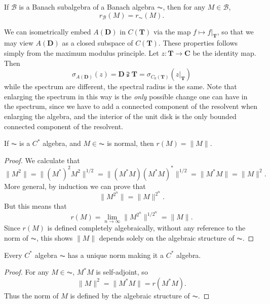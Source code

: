 \begin{corollary}
    If $\mathcal{B}$ is a Banach subalgebra of a Banach algebra $\AC$, then for any $M \in \mathcal{B}$,
    \[ r_{\mathcal{B}}(M) = r_{\AC}(M). \]
\end{corollary}

\begin{example}
    We can isometrically embed $A(\mathbf{D})$ in $C(\mathbf{T})$ via the map $f \mapsto f|_\mathbf{T}$, so that we may view $A(\mathbf{D})$ as a closed subspace of $C(\mathbf{T})$. These properties follows simply from the maximum modulus principle. Let $z: \mathbf{T} \to \mathbf{C}$ be the identity map. Then
    \[ \sigma_{A(\mathbf{D})}(z) = \mathbf{D} \supsetneqq \mathbf{T} = \sigma_{C_0(\mathbf{T})}(z|_\mathbf{T}) \]
    while the spectrum are different, the spectral radius is the same. Note that enlarging the spectrum in this way is the \emph{only} possible change one can have in the spectrum, since we have to add a connected component of the resolvent when enlarging the algebra, and the interior of the unit disk is the only bounded connected component of the resolvent.
\end{example}

\begin{corollary}
    If $\AC$ is a $C^*$ algebra, and $M \in \AC$ is normal, then $r(M) = \| M \|$.
\end{corollary}
\begin{proof}
    We calculate that
    \[ \| M^2 \| = \| (M^*)^2 M^2 \|^{1/2} = \| (M^* M) (M^* M)^* \|^{1/2} = \| M^* M \| = \| M \|^2. \]
    More general, by induction we can prove that
    \[ \| M^{2^n} \| = \| M \|^{2^n}. \]
    But this means that
    \[ r(M) = \lim_{n \to \infty} \| M^{2^n} \|^{1/2^n} = \| M \|. \]
    Since $r(M)$ is defined completely algebraically, without any reference to the norm of $\AC$, this shows $\| M \|$ depends solely on the algebraic structure of $\AC$.
\end{proof}

\begin{corollary}
    Every $C^*$ algebra $\AC$ has a unique norm making it a $C^*$ algebra.
\end{corollary}
\begin{proof}
    For any $M \in \AC$, $M^* M$ is self-adjoint, so
    \[ \| M \|^2 = \| M^*M \| = r(M^*M). \]
    Thus the norm of $M$ is defined by the algebraic structure of $\AC$.
\end{proof}

